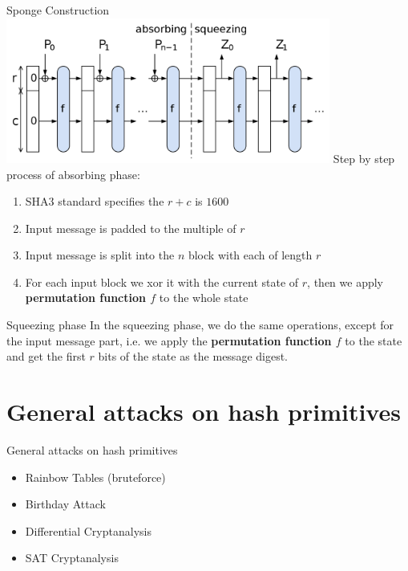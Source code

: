 \documentclass{beamer}
\begin{document}
\begin{frame}{Sponge Construction}
    \includegraphics[width=0.8\textwidth]{SpongeConstruction.svg.png}
    Step by step process of absorbing phase:
    \begin{enumerate}
        \item SHA3 standard specifies the $r+c$ is $1600$
        \item Input message is padded to the multiple of $r$
        \item Input message is split into the $n$ block with each of length $r$
        \item For each input block we xor it with the current state of $r$, 
        then we apply \textbf{permutation function $f$} to the whole state
    \end{enumerate}
\end{frame}

\begin{frame}{Squeezing phase}
    In the squeezing phase, we do the same operations, except for the input 
    message part, i.e. we apply the \textbf{permutation function $f$} to the 
    state and get the first $r$ bits of the state as the message digest.
\end{frame}

\section{General attacks on hash primitives}

\begin{frame}{General attacks on hash primitives}
    \begin{itemize}
        \item Rainbow Tables (bruteforce)
        \item Birthday Attack
        \item Differential Cryptanalysis
        \item SAT Cryptanalysis
    \end{itemize}
\end{frame}
\end{document}
